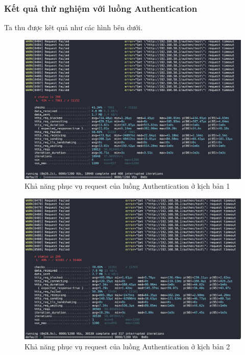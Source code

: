\subsubsection{Kết quả thử nghiệm với luồng Authentication}
\noindent Ta thu được kêt quả như các hình bên dưới.
\begin{figure}[H]
  \begin{center}
      \includegraphics[scale = 0.65]{images/hanh/fullflow-test/full-flow-authen-no-hpa}
      \vspace*{1mm}
  \end{center}
  \caption{Khả năng phục vụ request của luồng Authentication ở kịch bản 1}
  \label{fig:fullflow-authen-no-hpa}

\end{figure}
\begin{figure}[H]
  \begin{center}
      \includegraphics[scale = 0.65]{images/hanh/fullflow-test/full-flow-authen-with-hpa}
      \vspace*{1mm}
  \end{center}
  \caption{Khả năng phục vụ request của luồng Authentication ở kịch bản 2}
  \label{fig:fullflow-authen-with-hpa}

\end{figure}
